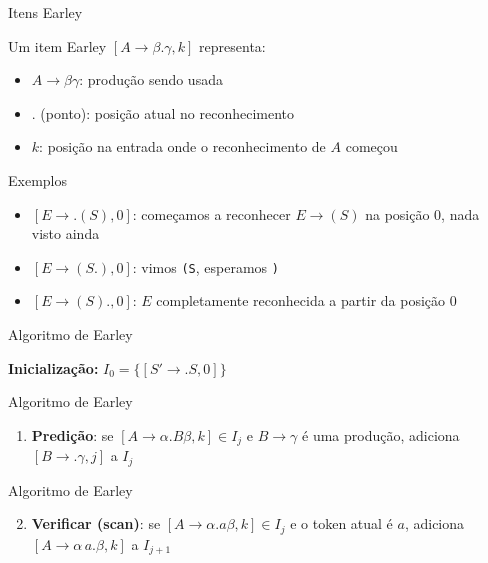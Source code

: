 \begin{frame}{Itens Earley}

    Um item Earley \([A \to \beta . \gamma, k]\) representa:

    \begin{itemize}

        \item
        \(A \to \beta\gamma\): produção sendo usada
        \item
        \(.\) (ponto): posição atual no reconhecimento
        \item
        \(k\): posição na entrada onde o reconhecimento de \(A\) começou
    \end{itemize}
\end{frame}

\begin{frame}[fragile]{Exemplos}

    \begin{itemize}

        \item
        \([E \to . (S), 0]\): começamos a reconhecer \(E \to (S)\) na posição
        0, nada visto ainda
        \item
        \([E \to ( S . ), 0]\): vimos \texttt{(S}, esperamos
        \texttt{)}
        \item
        \([E \to (S) ., 0]\): \(E\) completamente reconhecida a partir da
        posição 0
    \end{itemize}
\end{frame}

\begin{frame}{Algoritmo de Earley}

    \textbf{Inicialização:} \(I_0 = \{[S' \to . S, 0]\}\)
\end{frame}

\begin{frame}{Algoritmo de Earley}

    \begin{enumerate}

        \item
        \textbf{Predição}: se \([A \to \alpha . B \beta, k] \in I_j\) e
        \(B \to \gamma\) é uma produção, adiciona \([B \to . \gamma, j]\) a
        \(I_j\)
    \end{enumerate}
\end{frame}

\begin{frame}{Algoritmo de Earley}

    \begin{enumerate}
        \setcounter{enumi}{1}

        \item
        \textbf{Verificar (scan)}: se \([A \to \alpha . a \beta, k] \in I_j\)
        e o token atual é \(a\), adiciona \([A \to \alpha\, a . \beta, k]\) a
        \(I_{j+1}\)
    \end{enumerate}
\end{frame}

